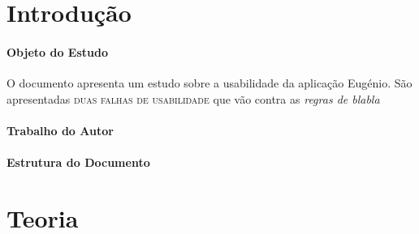 \documentclass[12pt,a4paper,headsepline,bibtotoc,twoside]{scrbook}
\begin{document}
\garamond
\graphicspath{{EPS/}}

\frontmatter

\thispagestyle{empty}
\cleardoublepage


\mainmatter


\cleardoublepage
\pagestyle{headings}
\setcounter{page}{1}
\tableofcontents
\cleardoublepage
 \listoffigures
 \cleardoublepage
 \listoftables
 \cleardoublepage
\cleardoublepage


\setcounter{page}{1}

\thispagestyle{plain}
\chapter{Introdução}

\subsubsection*{Objeto do Estudo}
\label{sec:estudo}
O documento apresenta um estudo sobre a usabilidade da aplicação Eugénio. 
São apresentadas \textsc{duas falhas de usabilidade} que vão contra as \textit{regras de blabla}

\subsubsection{Trabalho do Autor}

\subsubsection*{Estrutura do Documento}

\cleardoublepage
\chapter{Teoria}
\end{document}
